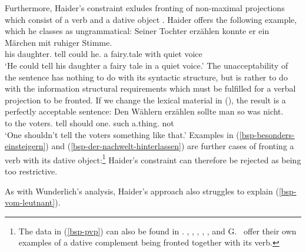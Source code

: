 Furthermore, Haider's constraint exludes fronting of non-maximal projections which consist of a verb
and a dative object \citet*[]{Haider82}. Haider offers the following example, which he classes as ungrammatical:
\ea
\gll Seiner Tochter erzählen konnte er ein Märchen mit ruhiger Stimme.\\
	 his daughter.\dat{} tell could he.\nom{} a fairy.tale\acc{} with quiet voice\\
\glt `He could tell his daughter a fairy tale in a quiet voice.'
\z
The unacceptability of the sentence has nothing to do with its syntactic structure, but is rather to do with the information
structural requirements which must be fulfilled for a verbal projection to be fronted. If we change the lexical material in (),
the result is a perfectly acceptable sentence:
\ea
\gll Den Wählern erzählen sollte man so was nicht.\\
	 to the voters.\dat{} tell should one.\nom{} such a.thing.\acc{} not\\
\glt `One shouldn't tell the voters something like that.'
\z
Examples in (\ref{bsp-besonders-einsteigern}) and (\ref{bsp-der-nachwelt-hinterlassen}) are further cases of fronting a verb with its dative object:\footnote{
	The data in (\ref{bsp-pvp}) can also be found in \citep[--354]{Mueller99a}.
	 \citet[]{Thiersch82a}, \citet[]{Sternefeld85a},
\citet[]{Uszkoreit87a},
\citet[]{SS88a},
\citet[Chapter~1.5.3.3.1]{Oppenrieder91a}, \citet[]{Grewendorf93} and G.\ \citet[]{GMueller98a}
offer their own examples of a dative complement being fronted together with its verb.%
}
Haider's constraint can therefore be rejected as being too restrictive.

As with Wunderlich's analysis, Haider's approach also struggles to explain (\ref{bsp-vom-leutnant}). 


